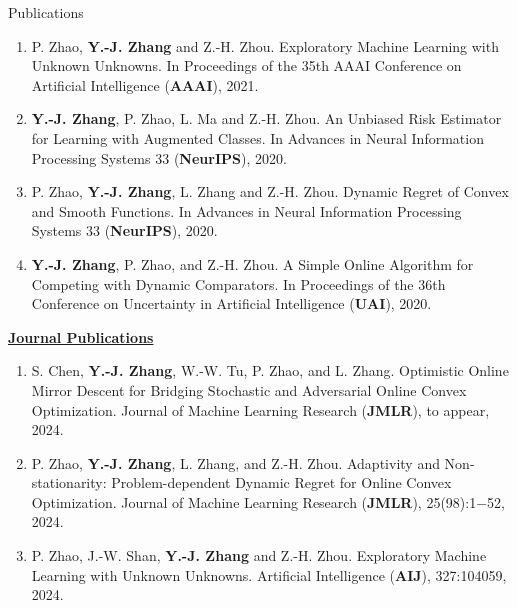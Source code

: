 \documentclass{resume} %
\begin{document}
\begin{rSection}{Publications}
\begin{enumerate}[leftmargin=*]
	\item P. Zhao, \textbf{Y.-J. Zhang} and Z.-H. Zhou. Exploratory Machine Learning with Unknown Unknowns. In {Proceedings of the 35th AAAI Conference on Artificial Intelligence} (\textbf{AAAI}), 2021.
	\item \textbf{Y.-J. Zhang}, P. Zhao, L. Ma and Z.-H. Zhou. An Unbiased Risk Estimator for Learning with Augmented Classes. In {Advances in Neural Information Processing Systems 33} (\textbf{NeurIPS}), 2020.
	\item P. Zhao, \textbf{Y.-J. Zhang}, L. Zhang and Z.-H. Zhou. Dynamic Regret of Convex and Smooth Functions. In {Advances in Neural Information Processing Systems 33} (\textbf{NeurIPS}), 2020.
	\item \textbf{Y.-J. Zhang}, P. Zhao, and Z.-H. Zhou. A Simple Online Algorithm for Competing with Dynamic Comparators. In {Proceedings of the 36th Conference on Uncertainty in Artificial Intelligence} (\textbf{UAI}), 2020.
\end{enumerate}
\noindent \underline{\textbf{Journal Publications}}
\begin{enumerate}[leftmargin=*]
	\item S. Chen, \textbf{Y.-J. Zhang}, W.-W. Tu, P. Zhao, and L. Zhang. Optimistic Online Mirror Descent for Bridging Stochastic and Adversarial Online Convex Optimization. Journal of Machine Learning Research (\textbf{JMLR}), to appear, 2024.
	\item P. Zhao, \textbf{Y.-J. Zhang}, L. Zhang, and Z.-H. Zhou. Adaptivity and Non-stationarity: Problem-dependent Dynamic Regret for Online Convex Optimization. Journal of Machine Learning Research (\textbf{JMLR}), 25(98):1−52, 2024.
	\item P. Zhao, J.-W. Shan, \textbf{Y.-J. Zhang} and Z.-H. Zhou. Exploratory Machine Learning with Unknown Unknowns. Artificial Intelligence (\textbf{AIJ}), 327:104059, 2024.
\end{enumerate}
\end{rSection}


\end{document}
